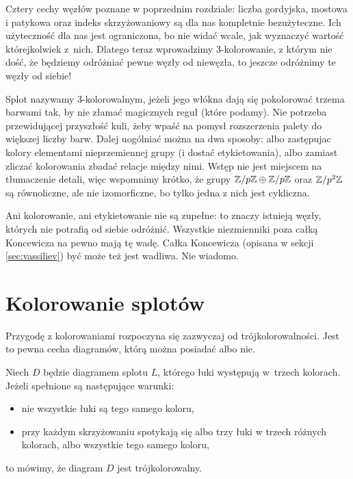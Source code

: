 
Cztery cechy węzłów poznane w poprzednim rozdziale: liczba gordyjska, mostowa i patykowa oraz indeks skrzyżowaniowy są dla nas kompletnie bezużyteczne.
Ich użyteczność dla nas jest ograniczona, bo nie widać wcale, jak wyznaczyć wartość którejkolwiek z~nich.
Dlatego teraz wprowadzimy 3-kolorowanie, z którym nie dość, że będziemy odróżniać pewne węzły od niewęzła, to jeszcze odróżnimy te węzły od siebie!

Splot nazywamy 3-kolorowalnym, jeżeli jego włókna dają się pokolorować trzema barwami tak, by nie złamać magicznych reguł (które podamy).
Nie potrzeba przewidującej przyszłość kuli, żeby wpaść na pomysł rozszerzenia palety do większej liczby barw.
Dalej uogólniać można na dwa sposoby: albo zastępujac kolory elementami nieprzemiennej grupy (i dostać etykietowania), albo zamiast zliczać kolorowania zbadać relacje między nimi.
Wstęp nie jest miejscem na tłumaczenie detali, więc wspomnimy krótko, że grupy $\mathbb Z/p\mathbb Z \oplus \mathbb Z/p\mathbb Z$ oraz $\mathbb Z/p^2 \mathbb Z$ są równoliczne, ale nie izomorficzne, bo tylko jedna z nich jest cykliczna.

Ani kolorowanie, ani etykietowanie nie są zupełne: to znaczy istnieją węzły, których nie potrafią od siebie odróżnić.
Wszystkie niezmienniki poza całką Koncewicza na pewno mają tę wadę.
Całka Koncewicza (opisana w sekcji \ref{sec:vassiliev}) być może też jest wadliwa.
Nie wiadomo.

\section{Kolorowanie splotów}
%

Przygodę z kolorowaniami rozpoczyna się zazwyczaj od trójkolorowalności.
Jest to pewna cecha diagramów, którą można posiadać albo nie.

\begin{definition}[trójkolorowalność]
%
    Niech $D$ będzie diagramem splotu $L$, którego łuki występują w~trzech kolorach.
    Jeżeli spełnione są następujące warunki:
    \begin{itemize}[leftmargin=*]
        \item nie wszystkie łuki są tego samego koloru,
        \item przy każdym skrzyżowaniu spotykają się albo trzy łuki w trzech różnych kolorach, albo wszystkie tego samego koloru,
    \end{itemize}
    to mówimy, że diagram $D$ jest trójkolorowalny.
\end{definition}

